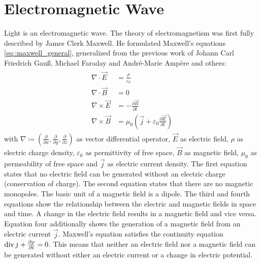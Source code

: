 \section{Electromagnetic Wave}
% 
Light is an electromagnetic wave.
The theory of electromagnetism was first fully described by James Clerk Maxwell.
He formulated Maxwell's equations \cref{eq::maxwell_general}, generalized from the previous work of Johann Carl Friedrich Gau{\ss}, Michael Faraday and Andr\'{e}-Marie Amp\`{e}re and others:
% 
\begin{align} 
\begin{split} \label{eq::maxwell_general}
    \nabla \cdot \vec{E} &= \frac {\rho} {\varepsilon_0}\\
    \nabla \cdot \vec{B} &= 0\\
    \nabla \times \vec{E} &= -\frac{\partial \vec{B}} {\partial t}\\
    \nabla \times \vec{B} &= \mu_0\left(\vec{j} + \varepsilon_0 \frac{\partial \vec{E}} {\partial t} \right)
\end{split}
\end{align}
% 
with $\nabla \coloneqq \left({\frac{\partial}{\partial x}}, {\frac{\partial}{\partial y}}, {\frac{\partial}{\partial z}} \right)$ as vector differential operator, $\vec{E}$ as electric field, $\rho$ as electric charge density, $\varepsilon_0$ as permittivity of free space, $\vec{B}$ as magnetic field, $\mu_0$ as permeability of free space and $\vec{j}$ as electric current density.
% 
The first equation states that no electric field can be generated without an electric charge (conservation of charge).
The second equation states that there are no magnetic monopoles.
The basic unit of a magnetic field is a dipole.
The third and fourth equations show the relationship between the electric and magnetic fields in space and time.
A change in the electric field results in a magnetic field and vice versa.
Equation four additionally shows the generation of a magnetic field from an electric current $\vec{j}$.
Maxwell's equation satisfies the continuity equation $\operatorname{div} j + \frac{\partial \rho}{\partial t} = 0$.
This means that neither an electric field nor a magnetic field can be generated without either an electric current or a change in electric potential.
%
% 
